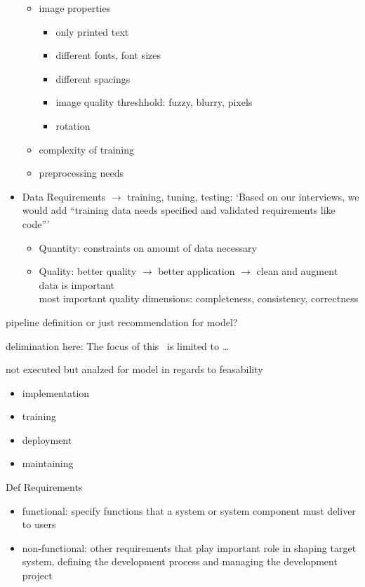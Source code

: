\begin{itemize}
\begin{itemize}
            \item image properties
                \begin{itemize}
                    \item only printed text
                    \item different fonts, font sizes
                    \item different spacings
                    \item image quality threshhold: fuzzy, blurry, pixels
                    \item rotation
                \end{itemize}
            \item complexity of training
            \item preprocessing needs
        \end{itemize}
    \item Data Requirements $\rightarrow$ training, tuning, testing: `Based on our interviews,
        we would add “training data needs specified and validated requirements like
        code”'~\cite{vogelsang_requirements_2019}
        \begin{itemize}
            \item Quantity: constraints on amount of data necessary
            \item Quality: better quality $\rightarrow$ better application $\rightarrow$ clean and
                augment data is important\\
                most important quality dimensions: completeness, consistency, correctness
        \end{itemize}
\end{itemize}

pipeline definition or just recommendation for model?


delimination here: The focus of this \the\arbeit\ is limited to \ldots

not executed but analzed for model in regards to feasability
\begin{itemize}
    \item implementation
    \item training
    \item deployment
    \item maintaining
\end{itemize}


Def Requirements~\cite{zowghi_requirements_2014}
\begin{itemize}
    \item functional: specify functions that a system or system component must deliver to
        users~\cite{noauthor_ieee_1998}
    \item non-functional: other requirements that play important role in shaping target system,
        defining the development process and managing the development project~\cite{kotonya_requirements_1998, chung_non-functional_2009}
\end{itemize}

